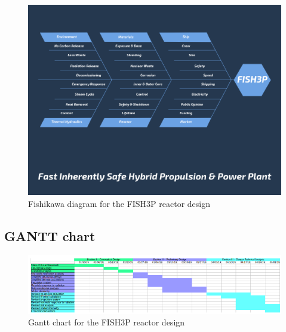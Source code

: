 \documentclass[12pt]{article}
\begin{document}
\begin{figure}[H]                                  
    \centering                                     
    \includegraphics[width=1\textwidth]{fishikawa}   
   \caption{Fishikawa diagram for the FISH3P reactor design}                          
   \label{fig:mesh1}     
\end{figure}                         

\subsection{GANTT chart}
\begin{figure}[H]                                  
    \centering                                     
    \includegraphics[width=1\textwidth]{gantt-chart}   
   \caption{Gantt chart for the FISH3P reactor design}                          
   \label{fig:mesh1}     
\end{figure}    


\end{document}
